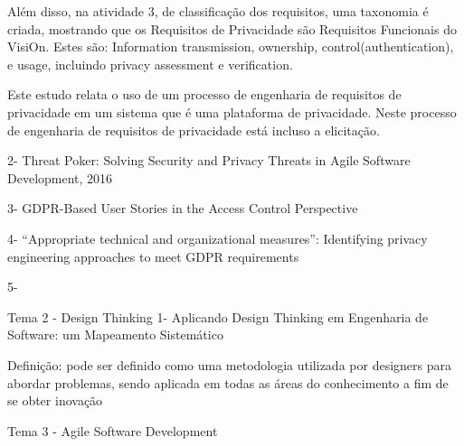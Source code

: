 Além disso, na atividade 3, de classificação dos requisitos, uma taxonomia é criada, mostrando que os Requisitos de Privacidade são Requisitos Funcionais do VisiOn. Estes são: Information transmission, ownership, control(authentication), e usage, incluindo privacy assessment e verification.

Este estudo relata o uso de um processo de engenharia de requisitos de privacidade em um sistema que é uma plataforma de privacidade. Neste processo de engenharia de requisitos de privacidade está incluso a elicitação.



2- Threat Poker: Solving Security and Privacy Threats in Agile Software Development, 2016



3- GDPR-Based User Stories in the Access Control Perspective





4- “Appropriate technical and organizational measures”: Identifying privacy engineering approaches to meet GDPR requirements



5- 






Tema 2 - Design Thinking
1- Aplicando Design Thinking em Engenharia de Software: um Mapeamento Sistemático

Definição: pode ser definido como uma metodologia utilizada por designers para abordar problemas, sendo aplicada em todas as áreas do conhecimento a fim de se obter inovação

Tema 3 - Agile Software Development
